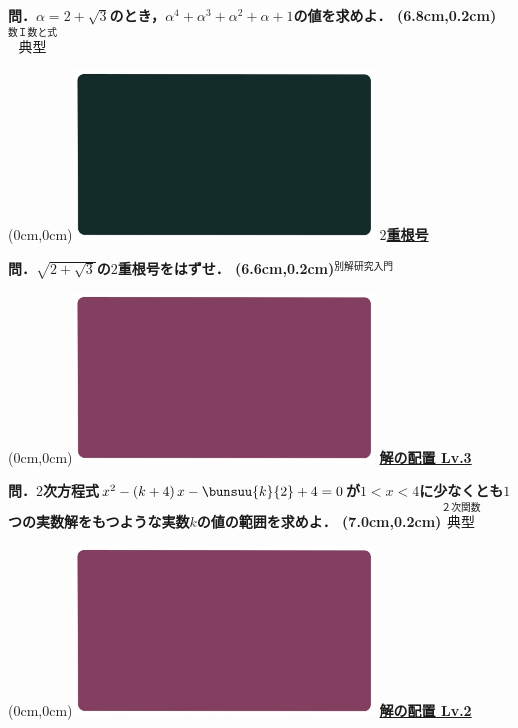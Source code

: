 \documentclass[10pt,
fleqn,
dvipdfmx,
uplatex
]{jsarticle}
\begin{document}
\huge 
\bf\boldmath 問．$\alpha =2+\sqrt 3$のとき，$\alpha ^4+\alpha ^3+\alpha ^2+\alpha +1$の値を求めよ．
\at(6.8cm,0.2cm){\small\color{bradorange}$\overset{\text{数Ｉ数と式}}{\text{典型}}$}


\newpage



\at(0cm,0cm){\includegraphics[width=8cm,bb=0 0 1920 1080]{./youtube/thumbnails/templates/smart_background/黒板風.jpeg}}
{\color{orange}\bf\boldmath\huge\underline{$2$重根号}}\vspace{0.3zw}

\huge 
\bf\boldmath 問．$\sqrt {2+\sqrt 3}$の$2$重根号をはずせ．
\at(6.6cm,0.2cm){\small\color{bradorange}$\overset{\text{別解研究入門}}{\text{}}$}


\newpage



\at(0cm,0cm){\includegraphics[width=8cm,bb=0 0 1920 1080]{./youtube/thumbnails/templates/smart_background/２次関数.jpeg}}
{\color{orange}\bf\boldmath\huge\underline{解の配置 Lv.3 }}\vspace{0.3zw}

\Large 
\bf\boldmath 問．$2$次方程式$x^2-\left(k+4\right)x-\bunsuu{k}{2}+4=0$が$1<x<4$に少なくとも$1$つの実数解をもつような実数$k$の値の範囲を求めよ．
\at(7.0cm,0.2cm){\small\color{bradorange}$\overset{\text{２次関数}}{\text{典型}}$}


\newpage



\at(0cm,0cm){\includegraphics[width=8cm,bb=0 0 1920 1080]{./youtube/thumbnails/templates/smart_background/２次関数.jpeg}}
{\color{orange}\bf\boldmath\huge\underline{解の配置 Lv.2 }}\vspace{0.3zw}
\end{document}
